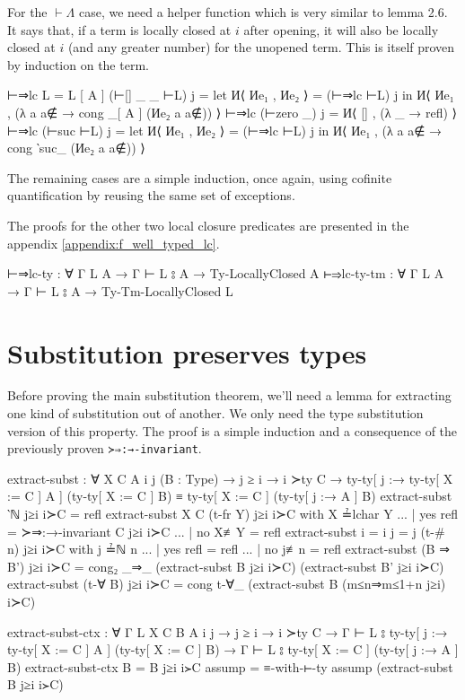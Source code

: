\documentclass[logo,bsc,singlespacing,parskip,online]{infthesis}
\begin{document}
For the $\vdash\Lambda$ case, we need a helper function which is very similar to lemma 2.6. It says
that, if a term is locally closed at $i$ after opening, it will also be locally closed at $i$ (and
any greater number) for the unopened term. This is itself proven by induction on the term.
\begin{code}
  ⊢⇒lc {L = L [ A ]} (⊢[] _ _ ⊢L) j =
    let И⟨ Иe₁ , Иe₂ ⟩ = (⊢⇒lc ⊢L) j
    in И⟨ Иe₁ , (λ a {a∉} → cong _[ A ]  (Иe₂ a {a∉})) ⟩
  ⊢⇒lc (⊢zero _) j = И⟨ [] , (λ _ → refl) ⟩
  ⊢⇒lc (⊢suc ⊢L) j = let И⟨ Иe₁ , Иe₂ ⟩ = (⊢⇒lc ⊢L) j
    in И⟨ Иe₁ , (λ a {a∉} → cong ‵suc_ (Иe₂ a {a∉})) ⟩
\end{code}
The remaining cases are a simple induction, once again, using cofinite quantification by reusing the
same set of exceptions.

The proofs for the other two local closure predicates are presented in the appendix \ref{appendix:f_well_typed_lc}.
\begin{code}
  ⊢⇒lc-ty : ∀ {Γ L A} → Γ ⊢ L ⦂ A → Ty-LocallyClosed A
  ⊢⇒lc-ty-tm : ∀ {Γ L A} → Γ ⊢ L ⦂ A → Ty-Tm-LocallyClosed L
\end{code}

\section{Substitution preserves types}
Before proving the main substitution theorem, we'll need a lemma for extracting one kind of
substitution out of another. We only need the type substitution version of this property. The proof
is a simple induction and a consequence of the previously proven \texttt{≻⇒:→-invariant}.
\begin{code}
  extract-subst : ∀ {X C A i j}
    (B : Type)
    → j ≥ i
    → i ≻ty C
    → ty-ty[ j :→ ty-ty[ X := C ] A ] (ty-ty[ X := C ] B)
        ≡ ty-ty[ X := C ] (ty-ty[ j :→ A ] B)
  extract-subst ‵ℕ j≥i i≻C = refl
  extract-subst {X} {C} (t-fr Y) j≥i i≻C with X ≟lchar Y
  ... | yes refl = ≻⇒:→-invariant C j≥i i≻C
  ... | no  X≢Y  = refl
  extract-subst {i = i} {j = j} (t-# n) j≥i i≻C with j ≟ℕ n
  ... | yes refl = refl
  ... | no  j≢n  = refl
  extract-subst (B ⇒ B') j≥i i≻C = cong₂ _⇒_
    (extract-subst B j≥i i≻C) (extract-subst B' j≥i i≻C)
  extract-subst (t-∀ B) j≥i i≻C =
    cong t-∀_ (extract-subst B (m≤n⇒m≤1+n j≥i) i≻C)

  extract-subst-ctx : ∀ {Γ L X C B A i j}
    → j ≥ i
    → i ≻ty C
    → Γ ⊢ L ⦂ ty-ty[ j :→ ty-ty[ X := C ] A ] (ty-ty[ X := C ] B)
    → Γ ⊢ L ⦂ ty-ty[ X := C ] (ty-ty[ j :→ A ] B)
  extract-subst-ctx {B = B} j≥i i≻C assump =
    ≡-with-⊢-ty assump (extract-subst B j≥i i≻C)
\end{code}
\end{document}
